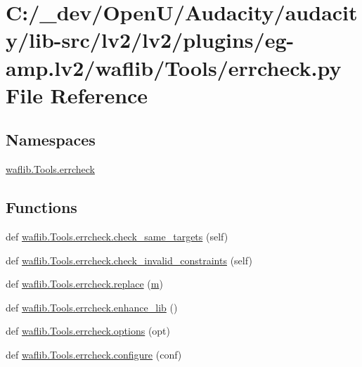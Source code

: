 \hypertarget{lv2_2plugins_2eg-amp_8lv2_2waflib_2_tools_2errcheck_8py}{}\section{C\+:/\+\_\+dev/\+Open\+U/\+Audacity/audacity/lib-\/src/lv2/lv2/plugins/eg-\/amp.lv2/waflib/\+Tools/errcheck.py File Reference}
\label{lv2_2plugins_2eg-amp_8lv2_2waflib_2_tools_2errcheck_8py}
\subsection*{Namespaces}
\begin{DoxyCompactItemize}
\item 
 \hyperlink{namespacewaflib_1_1_tools_1_1errcheck}{waflib.\+Tools.\+errcheck}
\end{DoxyCompactItemize}
\subsection*{Functions}
\begin{DoxyCompactItemize}
\item 
def \hyperlink{namespacewaflib_1_1_tools_1_1errcheck_abfda92de66a72045068f150db1f86e29}{waflib.\+Tools.\+errcheck.\+check\+\_\+same\+\_\+targets} (self)
\item 
def \hyperlink{namespacewaflib_1_1_tools_1_1errcheck_a77b03ce1d3ecfd9295275ce9685d1c80}{waflib.\+Tools.\+errcheck.\+check\+\_\+invalid\+\_\+constraints} (self)
\item 
def \hyperlink{namespacewaflib_1_1_tools_1_1errcheck_a3c373d095646ee41f81dd43ade9e0b63}{waflib.\+Tools.\+errcheck.\+replace} (\hyperlink{layer3_8c_a4b8bfe70f28d6faddcb10d6ecf8c1989}{m})
\item 
def \hyperlink{namespacewaflib_1_1_tools_1_1errcheck_a7752dc841ad9140b7f0dc591120a6a0d}{waflib.\+Tools.\+errcheck.\+enhance\+\_\+lib} ()
\item 
def \hyperlink{namespacewaflib_1_1_tools_1_1errcheck_ac059af9fc4bbe227373b3081aef0221d}{waflib.\+Tools.\+errcheck.\+options} (opt)
\item 
def \hyperlink{namespacewaflib_1_1_tools_1_1errcheck_a8456470882cfc53f245e965934344c2f}{waflib.\+Tools.\+errcheck.\+configure} (conf)
\end{DoxyCompactItemize}
